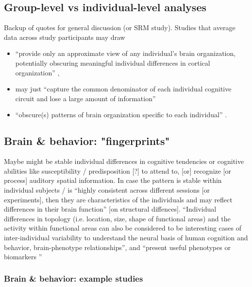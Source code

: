 \subsection{Group-level vs individual-level analyses}

Backup of quotes for general discussion (or SRM study).  Studies that average
data across study participants may draw

\begin{itemize}

\item ``provide only an approximate view of any individual's brain organization,
    potentially obscuring meaningful individual differences in cortical
        organization'' \citep{laumann2015functional},

\item may just ``capture the common denominator of each individual cognitive
    circuit and lose a large amount of information''

\item ``obscure(s) patterns of brain organization specific to each individual''
    \citep{laumann2015functional}.

\end{itemize}


\subsection{Brain \& behavior: "fingerprints"}

%
Maybe might be stable individual differences in cognitive tendencies or
cognitive abilities like susceptibility / predisposition [?] to attend to, [or]
recognize [or process] auditory spatial information.
In case the pattern is stable within individual subjects / is ``highly
consistent across different sessions [or experiments], then they are
characteristics of the individuals and may reflect differences in their brain
function'' \citep{kanai2011structural} [on structural diffences].
%
``Individual differences in topology (i.e. location, size, shape of functional
areas) and the activity within functional areas can also be considered to be
interesting cases of inter-individual variability to understand the neural basis
of human cognition and behavior, brain-phenotype relationships'', and ``present
useful phenotypes or biomarkers \citep{glasser2016multi,
vanhorn2008individual}''


\subsubsection{Brain \& behavior: example studies}

